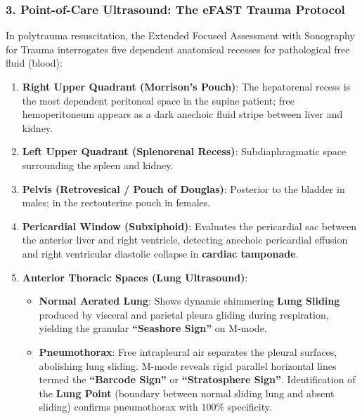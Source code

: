 \documentclass[11pt,a4paper]{article}
\begin{document}
\subsubsection{3. Point-of-Care Ultrasound: The eFAST Trauma Protocol}
In polytrauma resuscitation, the Extended Focused Assessment with Sonography for Trauma interrogates five dependent anatomical recesses for pathological free fluid (blood):
\begin{enumerate}
    \item \textbf{Right Upper Quadrant (Morrison's Pouch)}: The hepatorenal recess is the most dependent peritoneal space in the supine patient; free hemoperitoneum appears as a dark anechoic fluid stripe between liver and kidney.
    \item \textbf{Left Upper Quadrant (Splenorenal Recess)}: Subdiaphragmatic space surrounding the spleen and kidney.
    \item \textbf{Pelvis (Retrovesical / Pouch of Douglas)}: Posterior to the bladder in males; in the rectouterine pouch in females.
    \item \textbf{Pericardial Window (Subxiphoid)}: Evaluates the pericardial sac between the anterior liver and right ventricle, detecting anechoic pericardial effusion and right ventricular diastolic collapse in \textbf{cardiac tamponade}.
    \item \textbf{Anterior Thoracic Spaces (Lung Ultrasound)}:
    \begin{itemize}
        \item \textbf{Normal Aerated Lung}: Shows dynamic shimmering \textbf{Lung Sliding} produced by visceral and parietal pleura gliding during respiration, yielding the granular \textbf{``Seashore Sign''} on M-mode.
        \item \textbf{Pneumothorax}: Free intrapleural air separates the pleural surfaces, abolishing lung sliding. M-mode reveals rigid parallel horizontal lines termed the \textbf{``Barcode Sign''} or \textbf{``Stratosphere Sign''}. Identification of the \textbf{Lung Point} (boundary between normal sliding lung and absent sliding) confirms pneumothorax with $100\%$ specificity.
    \end{itemize}
\end{enumerate}
\end{document}
